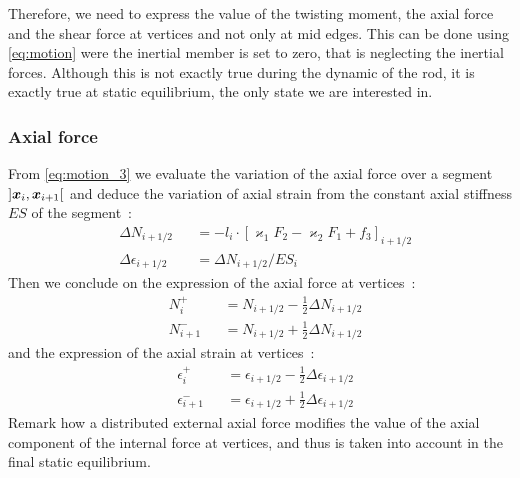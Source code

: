 Therefore, we need to express the value of the twisting moment, the axial force and the shear force at vertices and not only at mid edges. This can be done using \cref{eq:motion} were the inertial member is set to zero, that is neglecting the inertial forces. Although this is not exactly true during the dynamic of the rod, it is exactly true at static equilibrium, the only state we are interested in.

\subsubsection{Axial force}
From \cref{eq:motion_3} we evaluate the variation of the axial force over a segment $]\boldsymbol{x}_{i},  \boldsymbol{x}_{i+1}[$ and deduce the variation of axial strain from the constant axial stiffness $ES$ of the segment~: 
\begin{subequations}
	\begin{alignat}{2}
		&\Delta N_{i+1/2} &&= -l_i  \cdot {[\varkappa_1 F_2 - \varkappa_2 F_1 + f_3]}_{i+1/2}
		\label{eq:DeltaN}
		\\
		&\Delta \epsilon_{i+1/2} &&= \Delta N_{i+1/2} / {ES}_i
	\end{alignat}
\end{subequations}
Then we conclude on the expression of the axial force at vertices~:
\begin{subequations}
	\begin{alignat}{2}
		&N_{i}^{+} &&= N_{i+1/2} - \frac{1}{2} \Delta N_{i+1/2}  \\[0.5em]
		&N_{i+1}^{-} &&= N_{i+1/2} + \frac{1}{2} \Delta N_{i+1/2}
	\end{alignat}
	\label{eq:dNi}
\end{subequations}
and the expression of the axial strain at vertices~:
\begin{subequations}
	\begin{alignat}{2}
		&\epsilon_{i}^{+} &&= \epsilon_{i+1/2} - \frac{1}{2} \Delta \epsilon_{i+1/2}  \\[0.5em]
		&\epsilon_{i+1}^{-} &&= \epsilon_{i+1/2} + \frac{1}{2} \Delta \epsilon_{i+1/2}
	\end{alignat}
\end{subequations}
Remark how a distributed external axial force modifies the value of the axial component of the internal force at vertices, and thus is taken into account in the final static equilibrium.

